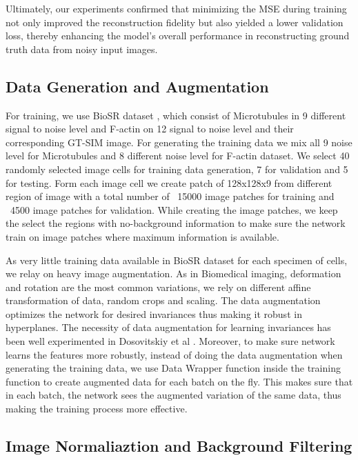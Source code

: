\documentclass[11pt,
  paper=a4, 
  bibliography=totocnumbered,
	captions=tableheading,
	BCOR=10mm
]{scrreprt}
\theoremstyle{definition}
\begin{document}
\vspace{1cm}
\noindent
Ultimately, our experiments confirmed that minimizing the MSE during training not only improved the reconstruction fidelity 
but also yielded a lower validation loss, thereby enhancing the model's overall performance in reconstructing ground truth data from noisy input images.



\subsection{Data Generation and Augmentation}
For training, we use BioSR dataset \cite{BioSR}, which consist of Microtubules in 9 different signal to noise level and F-actin on 12 signal to noise level and their corresponding GT-SIM image. 
For generating the training data we mix all 9 noise level for Microtubules and 8 different noise level for F-actin dataset. 
We select 40 randomly selected image cells for training data generation, 7 for validation and 5 for testing. 
Form each image cell we create patch of 128x128x9 from different region of image with a total number of ~15000 image patches for training and ~4500 image patches for validation. 
While creating the image patches, we keep the select the regions with no-background information to make sure the network train on image patches where maximum information is available. 

\vspace{1cm}
\noindent
As very little training data available in BioSR dataset for each specimen of cells, we relay on heavy image augmentation. As in Biomedical imaging, deformation and rotation are the most 
common variations, we rely on different affine transformation of data, random crops and scaling. The data augmentation optimizes the network for desired invariances thus making it robust 
in hyperplanes. The necessity of data augmentation for learning invariances has been well experimented in Dosovitskiy et al \cite{augmentation_hyperplane}. Moreover, to make sure network learns the features more robustly, 
instead of doing the data augmentation when generating the training data, we use Data Wrapper function inside the training function to  create augmented data for each batch on the fly. 
This makes sure that in each batch, the network sees the augmented variation of the same data, thus making the training process more effective. 


\subsection{Image Normaliaztion and Background Filtering}
\label{sec:image_normalization}
\end{document}
